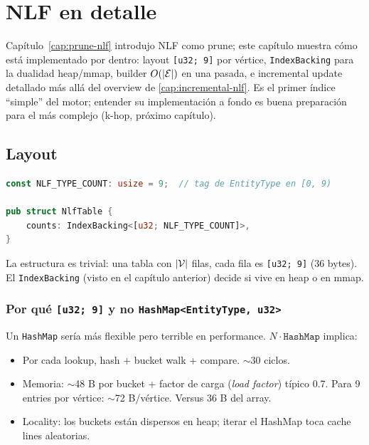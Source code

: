 \chapter{NLF en detalle}
\label{cap:nlf-detalle}

\begin{intuicion}
Capítulo~\ref{cap:prune-nlf} introdujo NLF como prune; este
capítulo muestra cómo está implementado por dentro: layout
\texttt{[u32; 9]} por vértice, \texttt{IndexBacking} para la
dualidad heap/mmap, builder \(O(|\mathcal{E}|)\) en una pasada, e
incremental update detallado más allá del overview de
\ref{cap:incremental-nlf}. Es el primer índice ``simple'' del
motor; entender su implementación a fondo es buena preparación para
el más complejo (k-hop, próximo capítulo).
\end{intuicion}

\section{Layout}

\begin{lstlisting}[language=Rust]
const NLF_TYPE_COUNT: usize = 9;  // tag de EntityType en [0, 9)

pub struct NlfTable {
    counts: IndexBacking<[u32; NLF_TYPE_COUNT]>,
}
\end{lstlisting}

\noindent
La estructura es trivial: una tabla con \(|\mathcal{V}|\) filas, cada fila
es \texttt{[u32; 9]} (36 bytes). El \texttt{IndexBacking} (visto
en el capítulo anterior) decide si vive en heap o en mmap.

\subsection{Por qué \texttt{[u32; 9]} y no \texttt{HashMap<EntityType, u32>}}

Un \texttt{HashMap} sería más flexible pero terrible en
performance. \(N \cdot \texttt{HashMap}\) implica:

\begin{itemize}
    \item Por cada lookup, hash + bucket walk + compare. \(\sim 30\)
    ciclos.
    \item Memoria: $\sim$48 B por bucket + factor de carga
    (\emph{load factor}) típico 0.7. Para 9 entries por vértice:
    $\sim$72 B/vértice. Versus 36 B del array.
    \item Locality: los buckets están dispersos en heap; iterar
    el HashMap toca cache lines aleatorias.
\end{itemize}

